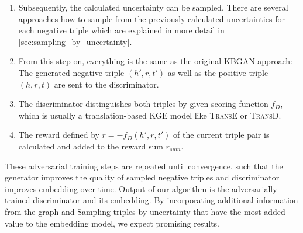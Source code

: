 \begin{enumerate}
    \item Subsequently, the calculated uncertainty can be sampled.
    There are several approaches how to sample from the previously calculated uncertainties for each negative triple which are explained in more detail in \autoref{sec:sampling_by_uncertainty}.
    
     \item 
    From this step on, everything is the same as the original \ac{KBGAN} approach:
    The generated negative triple $(h',r,t')$ as well as the positive triple $(h, r, t)$ are sent to the discriminator.
    
    \item 
    The discriminator distinguishes both triples by given scoring function $f_D$, which is usually a translation-based \ac{KGE} model like \textsc{TransE} or \textsc{TransD}.
    
    \item 
    The reward defined by $r = - f_D(h',r,t')$ of the current triple pair is calculated and added to the reward sum $r_{sum}$.
\end{enumerate}
These adversarial training steps are repeated until convergence, such that the generator improves the quality of sampled negative triples and discriminator improves embedding over time.
Output of our algorithm is the adversarially trained discriminator and its embedding.
By incorporating additional information from the graph and Sampling triples by uncertainty that have the most added value to the embedding model, we expect promising results.